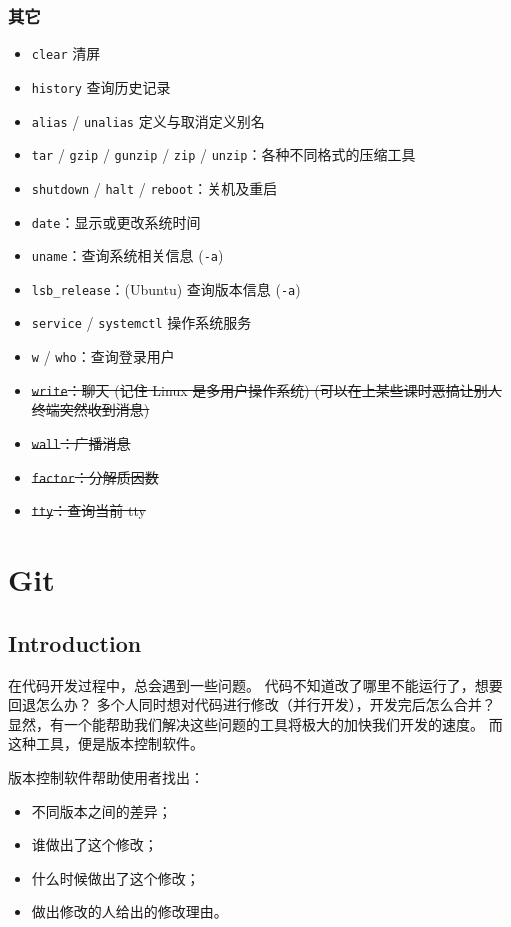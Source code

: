 \documentclass{article}
\begin{document}
	\subsubsection{其它}

	\begin{itemize}
		\itemsep0pt
		\item \texttt{clear} 清屏
		\item \texttt{history} 查询历史记录
		\item \texttt{alias} / \texttt{unalias} 定义与取消定义别名
		\item \texttt{tar} / \texttt{gzip} / \texttt{gunzip} / \texttt{zip} / \texttt{unzip}：各种不同格式的压缩工具
		\item \texttt{shutdown} / \texttt{halt} / \texttt{reboot}：关机及重启
		\item \texttt{date}：显示或更改系统时间
		\item \texttt{uname}：查询系统相关信息 (\texttt{-a})
		\item \texttt{lsb\_release}：(Ubuntu) 查询版本信息 (\texttt{-a})
		\item \texttt{service} / \texttt{systemctl} 操作系统服务
		\item \texttt w / \texttt{who}：查询登录用户
		\item \sout{\texttt{write}：聊天 (记住 Linux 是多用户操作系统) (可以在上某些课时恶搞让别人终端突然收到消息)}
		\item \sout{\texttt{wall}：广播消息}
		\item \sout{\texttt{factor}：分解质因数}
		\item \sout{\texttt{tty}：查询当前 tty}
	\end{itemize}

	\section{Git}

	\subsection{Introduction}

	在代码开发过程中，总会遇到一些问题。
	代码不知道改了哪里不能运行了，想要回退怎么办？
	多个人同时想对代码进行修改（并行开发），开发完后怎么合并？
	显然，有一个能帮助我们解决这些问题的工具将极大的加快我们开发的速度。
	而这种工具，便是版本控制软件。

	版本控制软件帮助使用者找出：

	\begin{itemize}
		\itemsep0pt
		\item 不同版本之间的差异；
		\item 谁做出了这个修改；
		\item 什么时候做出了这个修改；
		\item 做出修改的人给出的修改理由。
	\end{itemize}
\end{document}
